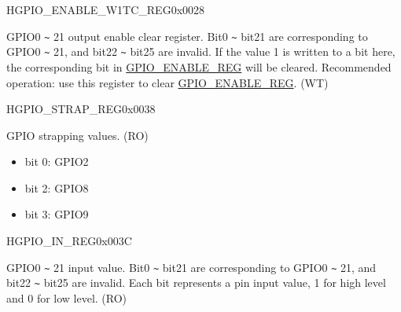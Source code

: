 \begin{register}{H}{GPIO\_ENABLE\_W1TC\_REG}{0x0028}\label{regdesc:GPIOENABLEW1TCREG}
%
%
\regnewline%
\begin{regdesc}\begin{reglist}
\label{fielddesc:GPIOENABLEW1TC}\item [GPIO\_ENABLE\_W1TC] GPIO0 \verb+~+ 21 output enable clear register. Bit0 \verb+~+ bit21 are corresponding to GPIO0 \verb+~+ 21, and bit22 \verb+~+ bit25 are invalid. If the value 1 is written to a bit here, the corresponding bit in \hyperref[regdesc:GPIOENABLEREG]{GPIO\_ENABLE\_REG} will be cleared. Recommended operation: use this register to clear \hyperref[regdesc:GPIOENABLEREG]{GPIO\_ENABLE\_REG}. (WT)
\end{reglist}\end{regdesc}
\end{register}


\begin{register}{H}{GPIO\_STRAP\_REG}{0x0038}\label{regdesc:GPIOSTRAPREG}
%
%
\regnewline%
\begin{regdesc}\begin{reglist}
\label{fielddesc:GPIOSTRAPPING}\item [GPIO\_STRAPPING] GPIO strapping values. (RO)
\begin{itemize}
    \item bit 0: GPIO2
    \item bit 2: GPIO8
    \item bit 3: GPIO9
\end{itemize}
\end{reglist}\end{regdesc}
\end{register}


\begin{register}{H}{GPIO\_IN\_REG}{0x003C}\label{regdesc:GPIOINREG}
%
%
\regnewline%
\begin{regdesc}\begin{reglist}
\label{fielddesc:GPIOINDATANEXT}\item [GPIO\_IN\_DATA\_NEXT] GPIO0 \verb+~+ 21 input value. Bit0 \verb+~+ bit21 are corresponding to GPIO0 \verb+~+ 21, and bit22 \verb+~+ bit25 are invalid. Each bit represents a pin input value, 1 for high level and 0 for low level. (RO)
\end{reglist}\end{regdesc}
\end{register}


